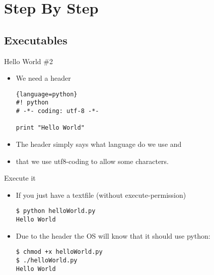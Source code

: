 \documentclass[handout]{beamer}
\begin{document}
\section{Step By Step}
    \subsection{Executables}
		\begin{frame}[fragile]{Hello World \#2}
			\begin{itemize}
                \item<1-> We need a header
                \begin{lstlisting}{language=python}
#! python
# -*- coding: utf-8 -*-

print "Hello World"
\end{lstlisting}
                \item<2-> The header simply says what language do we use and
                \item<3-> that we use utf8-coding to allow some characters.
            \end{itemize}
		\end{frame}
		\begin{frame}[fragile]{Execute it}
			\begin{itemize}
                \item<1-> If you just have a textfile (without execute-permission)
                \begin{lstlisting}
$ python helloWorld.py
Hello World
\end{lstlisting}
                \item<2-> Due to the header the OS will know that it should use python:
                \begin{lstlisting}
$ chmod +x helloWorld.py
$ ./helloWorld.py
Hello World
\end{lstlisting}
            \end{itemize}
		\end{frame}
\end{document}
